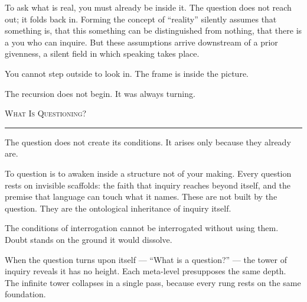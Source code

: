 \documentclass[10pt, openany, oneside]{book}
\begin{document}
\noindent To ask what is real, you must already be inside it. The question does not reach out; it folds back in. Forming the concept of ``reality'' silently assumes that something is, that this something can be distinguished from nothing, that there is a you who can inquire. But these assumptions arrive downstream of a prior givenness, a silent field in which speaking takes place.

\vspace{0.5em}

\noindent You cannot step outside to look in. The frame is inside the picture.

\vspace{0.5em}

\noindent The recursion does not begin. It was always turning.

\vspace{2em}

\begin{center}
    {\scshape What Is Questioning?}\\[0.3em]
    \rule{0.2\textwidth}{0.3pt}
\end{center}

\vspace{1em}

\noindent The question does not create its conditions. It arises only because they already are.

\vspace{0.5em}

\noindent To question is to awaken inside a structure not of your making. Every question rests on invisible scaffolds: the faith that inquiry reaches beyond itself, and the premise that language can touch what it names. These are not built by the question. They are the ontological inheritance of inquiry itself.

\vspace{0.5em}

\noindent The conditions of interrogation cannot be interrogated without using them. Doubt stands on the ground it would dissolve.

\vspace{0.5em}

\noindent When the question turns upon itself --- ``What is a question?'' --- the tower of inquiry reveals it has no height. Each meta-level presupposes the same depth. The infinite tower collapses in a single pass, because every rung rests on the same foundation.

\vspace{0.5em}
\end{document}
